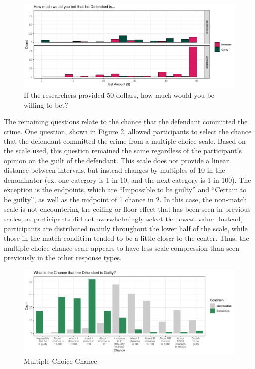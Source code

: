 \documentclass[print]{nuthesis}
\begin{document}
\begin{figure}

{\centering \includegraphics[width=\linewidth]{thesis_files/figure-latex/betting-1} 

}

\caption{If the researchers provided 50 dollars, how much would you be willing to bet?}\label{fig:betting}
\end{figure}

The remaining questions relate to the chance that the defendant committed the crime.
One question, shown in Figure \ref{fig:fixedlike}, allowed participants to select the chance that the defendant committed the crime from a multiple choice scale.
Based on the scale used, this question remained the same regardless of the participant's opinion on the guilt of the defendant.
This scale does not provide a linear distance between intervals, but instead changes by multiples of 10 in the denominator (ex. one category is 1 in 10, and the next category is 1 in 100).
The exception is the endpoints, which are ``Impossible to be guilty'' and ``Certain to be guilty'', as well as the midpoint of 1 chance in 2.
In this case, the non-match scale is not encountering the ceiling or floor effect that has been seen in previous scales, as participants did not overwhelmingly select the lowest value.
Instead, participants are distributed mainly throughout the lower half of the scale, while those in the match condition tended to be a little closer to the center.
Thus, the multiple choice chance scale appears to have less scale compression than seen previously in the other response types.

\begin{figure}

{\centering \includegraphics[width=\linewidth]{thesis_files/figure-latex/fixedlike-1} 

}

\caption{Multiple Choice Chance}\label{fig:fixedlike}
\end{figure}
\end{document}

